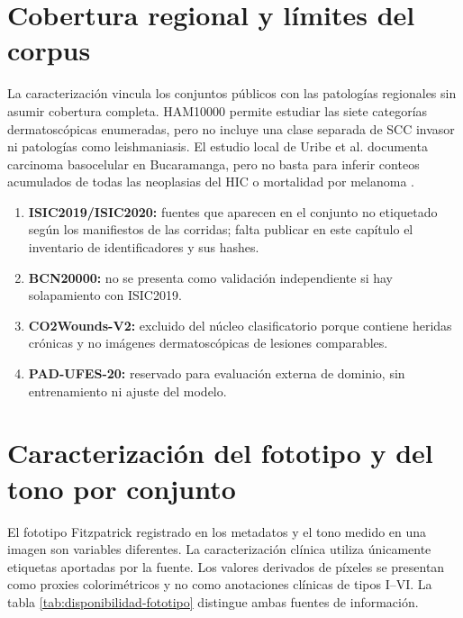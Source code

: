 \section{Cobertura regional y límites del corpus}

La caracterización vincula los conjuntos públicos con las patologías regionales sin asumir cobertura completa. HAM10000 permite estudiar las siete categorías dermatoscópicas enumeradas, pero no incluye una clase separada de SCC invasor ni patologías como leishmaniasis. El estudio local de Uribe et al. documenta carcinoma basocelular en Bucaramanga, pero no basta para inferir conteos acumulados de todas las neoplasias del HIC o mortalidad por melanoma \parencite{uribe2018bccbucaramanga}.

\begin{enumerate}[label=\alph*)]
    \item \textbf{ISIC2019/ISIC2020:} fuentes que aparecen en el conjunto no etiquetado según los manifiestos de las corridas; falta publicar en este capítulo el inventario de identificadores y sus hashes.
    \item \textbf{BCN20000:} no se presenta como validación independiente si hay solapamiento con ISIC2019.
    \item \textbf{CO2Wounds-V2:} excluido del núcleo clasificatorio porque contiene heridas crónicas y no imágenes dermatoscópicas de lesiones comparables.
    \item \textbf{PAD-UFES-20:} reservado para evaluación externa de dominio, sin entrenamiento ni ajuste del modelo.
\end{enumerate}

\section{Caracterización del fototipo y del tono por conjunto}

El fototipo Fitzpatrick registrado en los metadatos y el tono medido en una imagen son variables diferentes. La caracterización clínica utiliza únicamente etiquetas aportadas por la fuente. Los valores derivados de píxeles se presentan como proxies colorimétricos y no como anotaciones clínicas de tipos I--VI. La tabla \ref{tab:disponibilidad-fototipo} distingue ambas fuentes de información.

